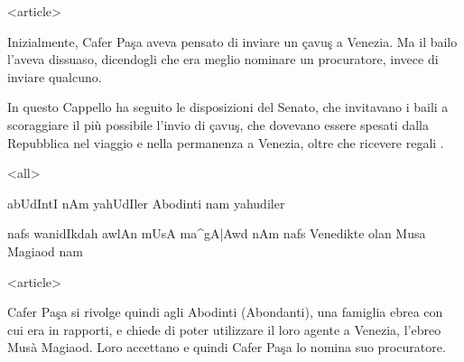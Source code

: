 


\mode
<article>

Inizialmente, Cafer Paşa aveva pensato  di inviare un çavuş a Venezia.
Ma il  bailo l'aveva dissuaso,  dicendogli che era meglio  nominare un
procuratore, invece di inviare qualcuno.

In  questo  Cappello  ha  seguito  le  disposizioni  del  Senato,  che
invitavano i  baili a scoraggiare  il più possibile l'invio  di çavuş,
che  dovevano essere  spesati  dalla Repubblica  nel  viaggio e  nella
permanenza a Venezia, oltre che ricevere regali \cite{pedani1994}.

\mode
<all>

                   {{\setarab   abUdIntI}  nAm   yahUdIler}
                   {Abodinti nam yahudiler}%

                   {nafs wanidIkdah  awlAn mUsA  ma^gA|Awd  nAm}
                   {nafs Venedikte olan Musa Magiaod nam}%

\mode
<article>

Cafer Paşa  si rivolge quindi agli Abodinti  (Abondanti), una famiglia
ebrea con  cui era in rapporti,  e chiede di poter  utilizzare il loro
agente a Venezia, l'ebreo Musà  Magiaod. Loro accettano e quindi Cafer
Paşa lo nomina suo procuratore.

